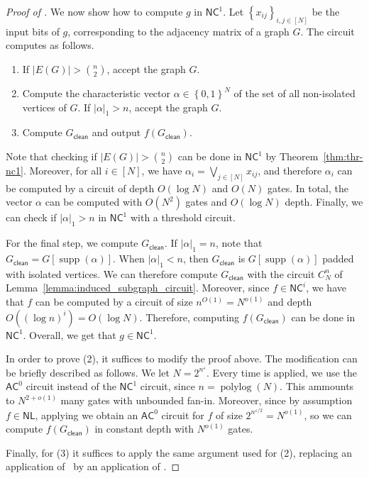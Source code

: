 \documentclass[10pt,a4paper]{article}
\newcommand{\eps}{\varepsilon}
\DeclareMathOperator{\supp}{supp}
\DeclareMathOperator{\polylog}{polylog}
\newcommand{\complexityfont}[1]{\mathsf{#1}}
\newcommand\NL           {\complexityfont{NL}}
\def\AC           {\complexityfont{AC}}
\def\NC           {\complexityfont{NC}}
\newcommand{\Gclean}[1]{{#1}_{\mathsf{clean}}}
\newcommand{\set}[1]{\left\{#1\right\}}
\newcommand{\card}[1]{\lvert#1\rvert}
\newcommand{\hwt}[1]{\card{#1}_1}
\newcommand{\blt}{\set{0,1}}
\begin{document}
\begin{proof}[Proof of ]
    We now show how to compute $g$ in $\NC^1$.
    Let $\set{x_{ij}}_{i,j \in [N]}$ be the input bits of $g$,
    corresponding to the adjacency matrix of a graph $G$.
    The circuit computes as follows.

    \begin{enumerate}
        \item If $\card{E(G)} > \binom{n}{2}$, accept the graph $G$.
        \item Compute the characteristic vector $\alpha \in \blt^N$
            of the set of all non-isolated vertices of $G$.
            If $\hwt{\alpha} > n$, accept the graph $G$.
        \item Compute $\Gclean{G}$ and output $f(\Gclean{G})$.
    \end{enumerate}


    Note that checking if
    $\card{E(G)} > \binom{n}{2}$
    can be done 
    in $\NC^1$ by Theorem~\ref{thm:thr-nc1}.
    Moreover,
    for all $i \in [N]$,
    we have $\alpha_i = \bigvee_{j \in [N]} x_{ij}$,
    and therefore $\alpha_i$ can be computed by a circuit of depth $O(\log N)$ 
    and $O(N)$ gates.
    In total, 
    the vector $\alpha$ can be computed
     with $O(N^2)$ gates and $O(\log N)$ depth.
    Finally, we can check if
    $\hwt{\alpha} > n$
    in $\NC^1$ with a threshold circuit.

    For the final step, we compute $\Gclean{G}$.
    If $\hwt{\alpha} = n$,
    note that $\Gclean{G} = G[\supp(\alpha)]$.
    When $\hwt{\alpha} < n$,
    then $\Gclean{G}$ is $G[\supp(\alpha)]$ padded with isolated vertices.
    We can therefore compute $\Gclean{G}$
    with the circuit 
    $C_N^n$
    of Lemma~\ref{lemma:induced_subgraph_circuit}.
    Moreover, since $f \in \NC^i$,
    we have that $f$ can be computed by a circuit of size
    $n^{O(1)} = N^{o(1)}$
    and depth
    $O((\log n)^i) = O(\log N)$.
    Therefore, computing $f(\Gclean{G})$ can be done in $\NC^1$. Overall, we get that $g \in \NC^1$.

    In order to prove (2), it suffices to modify the proof above.
    The modification can be briefly described as follows.
    We let $N = 2^{n^\eps}$.
    Every time  is applied,
    we use the $\AC^0$ circuit instead of the $\NC^1$ circuit,
    since $n = \polylog(N)$. This ammounts to $N^{2+o(1)}$ many gates with
    unbounded fan-in.
    Moreover, since by assumption 
    $f \in \NL$,
    applying  we obtain 
    an
    $\AC^0$ circuit for
    $f$ of size
    $2^{n^{\eps/2}} = N^{o(1)}$,
    so we can compute $f(\Gclean{G})$ in constant depth
    with $N^{o(1)}$ gates.

    Finally, for (3) it suffices to apply the same argument used for (2),
    replacing an application of~
    by an application of .
\end{proof}
\end{document}
